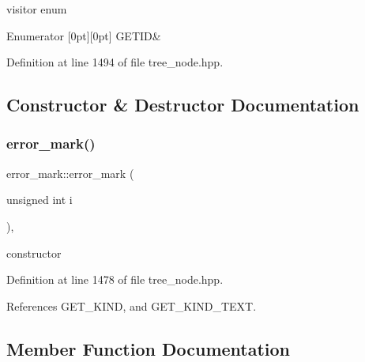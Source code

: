 visitor enum 

\begin{DoxyEnumFields}{Enumerator}
[0pt][0pt]{}\mbox{\label{structerror__mark_a87b50c3f099b89b0f7ae1b9db42b7bc0a3bf6c082318d4e7cd259d71946ec7448}} 
G\+E\+T\+ID&\\
\hline

\end{DoxyEnumFields}


Definition at line 1494 of file tree\+\_\+node.\+hpp.



\subsection{Constructor \& Destructor Documentation}
\mbox{\label{structerror__mark_a9cdcb3763ecb8e7a25f3548187a0347a}} 
\subsubsection{\texorpdfstring{error\+\_\+mark()}{error\_mark()}}
{\footnotesize\ttfamily error\+\_\+mark\+::error\+\_\+mark (\begin{DoxyParamCaption}\item[{unsigned int}]{i }\end{DoxyParamCaption})\hspace{0.3cm}{\ttfamily [inline]}, {\ttfamily [explicit]}}



constructor 



Definition at line 1478 of file tree\+\_\+node.\+hpp.



References G\+E\+T\+\_\+\+K\+I\+ND, and G\+E\+T\+\_\+\+K\+I\+N\+D\+\_\+\+T\+E\+XT.



\subsection{Member Function Documentation}
\mbox{\label{structerror__mark_a13abf9f9413d995a63882a657049d7c5}} 

